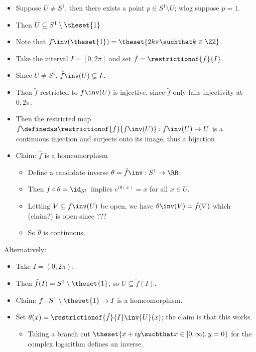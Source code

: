 \begin{itemize}
\tightlist
\item
  Suppose \(U\neq S^1\), then there exists a point
  \(p\in S^1\setminus U\); wlog suppose \(p=1\).
\item
  Then \(U \subseteq S^1\setminus\theset{1}\)
\item
  Note that \(f\inv(\theset{1}) = \theset{2k\pi \suchthat k\in \ZZ}\).
\item
  Take the interval \(I = [0, 2\pi]\) and set
  \(\tilde f = \restrictionof{f}{I}\).
\item
  Since \(U\neq S^1\), \(\tilde f\inv(U) \subsetneq I\).
\item
  Then \(\tilde f\) restricted to \(f\inv(U)\) is injective, since
  \(\tilde f\) only fails injectivity at \(0, 2\pi\).
\item
  Then the restricted map
  \(\hat f \definedas \restrictionof{f}{f\inv(U)}: f\inv(U) \to U\) is a
  continuous injection and surjects onto its image, thus a bijection
\item
  Claim: \(\hat f\) is a homeomorphism

  \begin{itemize}
  \tightlist
  \item
    Define a candidate inverse \(\theta = \hat f \inv: S^1 \to \RR\).
  \item
    Then \(f\circ \theta = \id_{S^1}\) implies \(e^{i\theta(x)} = x\)
    for all \(x\in U\).
  \item
    Letting \(V \subseteq f\inv(U)\) be open, we have
    \(\theta\inv(V) = \hat f(V)\) which (claim?) is open since ???
  \item
    So \(\theta\) is continuous.
  \end{itemize}
\end{itemize}

Alternatively:

\begin{itemize}
\tightlist
\item
  Take \(I = (0, 2\pi)\).
\item
  Then \(\tilde f(I) = S^1\setminus\theset{1}\), so
  \(U \subseteq \tilde f(I)\).
\item
  Claim: \(f: S^1\setminus\theset{1} \to I\) is a homeomorphism.
\item
  Set \(\theta(x) = \restrictionof{\tilde f}{I}\inv{U}(x)\); the claim
  is that this works.

  \begin{itemize}
  \tightlist
  \item
    Taking a branch cut
    \(\theset{x + iy \suchthat x\in [0, \infty), y = 0}\) for the
    complex logarithm defines an inverse. 
  \end{itemize}
\end{itemize}

